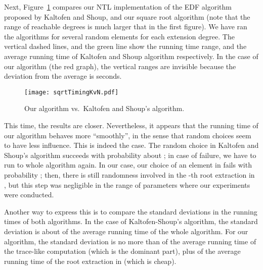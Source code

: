 \documentclass[12pt]{article}
\theoremstyle{plain}
\theoremstyle{definition}
\newcounter{algorithm}
\begin{document}
Next, Figure~\ref{figure:sqrtTimingKvN} compares our NTL
implementation of the EDF algorithm proposed by Kaltofen and Shoup,
and our square root algorithm (note that the range of reachable degrees
is much larger that in the first figure). We have ran the algorithms
for several random elements for each extension degree. The vertical dashed
lines, and the green line show the running time range, and the average 
running time of Kaltofen and Shoup algorithm respectively. In the case of 
our algorithm (the red graph), the vertical ranges are invisible because the 
deviation from the average is  seconds. 

\begin{figure}[ht]
\begin{center}
\texttt{[image: sqrtTimingKvN.pdf]}
\end{center}
\caption{\small Our algorithm vs.\ Kaltofen and Shoup's algorithm.}
\label{figure:sqrtTimingKvN}
\end{figure}

This time, the results are closer. Nevertheless, it appears that the
running time of our algorithm behaves more ``smoothly'', in the sense that
random choices seem to have less influence. This is indeed the
case. The random choice in Kaltofen and Shoup's algorithm succeeds
with probability about ; in case of failure, we have to run to
whole algorithm again. In our case, our choice of an element  in
 fails with probability ; then, there is still
randomness involved in the -th root extraction in , but this
step was negligible in the range of parameters where our experiments
were conducted. 

Another way to express this is to compare the standard deviations in
the running times of both algorithms. In the case of Kaltofen-Shoup's
algorithm, the standard deviation is about  of the average
running time of the whole algorithm. For our algorithm, the standard
deviation is no more than  of the average running time of the
trace-like computation (which is the dominant part), plus 
of the average running time of the root extraction in  (which is cheap).





\end{document}
